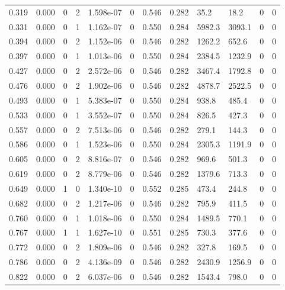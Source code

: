 \documentclass[preview]{standalone}
\begin{document}
{{\begin{tabular}{L{1.2cm}C{1.2cm} C{0.3cm}C{0.5cm} C{1.4cm}C{1.4cm} C{1.4cm}C{1.4cm} C{1.6cm}C{1.6cm} C{1.6cm}C{1.6cm}}
  0.319  &  0.000  & 0     &  2 &  1.598e-07  & 0  &  0.546&   0.282& 35.2 & 18.2   &  0 & 0  \\ 
  0.331  &  0.000  & 0     &  1 &  1.162e-07  & 0  &  0.550&   0.284& 5982.3 & 3093.1   &  0 & 0  \\ 
  0.394  &  0.000  & 0     &  2 &  1.152e-06  & 0  &  0.546&   0.282& 1262.2 & 652.6   &  0 & 0  \\ 
  0.397  &  0.000  & 0     &  1 &  1.013e-06  & 0  &  0.550&   0.284& 2384.5 & 1232.9   &  0 & 0  \\ 
  0.427  &  0.000  & 0     &  2 &  2.572e-06  & 0  &  0.546&   0.282& 3467.4 & 1792.8   &  0 & 0  \\ 
  0.476  &  0.000  & 0     &  2 &  1.902e-06  & 0  &  0.546&   0.282& 4878.7 & 2522.5   &  0 & 0  \\ 
  0.493  &  0.000  & 0     &  1 &  5.383e-07  & 0  &  0.550&   0.284& 938.8 & 485.4   &  0 & 0  \\ 
  0.533  &  0.000  & 0     &  1 &  3.552e-07  & 0  &  0.550&   0.284& 826.5 & 427.3   &  0 & 0  \\ 
  0.557  &  0.000  & 0     &  2 &  7.513e-06  & 0  &  0.546&   0.282& 279.1 & 144.3   &  0 & 0  \\ 
  0.586  &  0.000  & 0     &  1 &  1.523e-06  & 0  &  0.550&   0.284& 2305.3 & 1191.9   &  0 & 0  \\ 
  0.605  &  0.000  & 0     &  2 &  8.816e-07  & 0  &  0.546&   0.282& 969.6 & 501.3   &  0 & 0  \\ 
  0.619  &  0.000  & 0     &  2 &  8.779e-06  & 0  &  0.546&   0.282& 1379.6 & 713.3   &  0 & 0  \\ 
  0.649  &  0.000  & 1     &  0 &  1.340e-10  & 0  &  0.552&   0.285& 473.4 & 244.8   &  0 & 0  \\ 
  0.682  &  0.000  & 0     &  2 &  1.217e-06  & 0  &  0.546&   0.282& 795.9 & 411.5   &  0 & 0  \\ 
  0.760  &  0.000  & 0     &  1 &  1.018e-06  & 0  &  0.550&   0.284& 1489.5 & 770.1   &  0 & 0  \\ 
  0.767  &  0.000  & 1     &  1 &  1.627e-10  & 0  &  0.551&   0.285& 730.3 & 377.6   &  0 & 0  \\ 
  0.772  &  0.000  & 0     &  2 &  1.809e-06  & 0  &  0.546&   0.282& 327.8 & 169.5   &  0 & 0  \\ 
  0.786  &  0.000  & 0     &  2 &  4.136e-09  & 0  &  0.546&   0.282& 2430.9 & 1256.9   &  0 & 0  \\ 
  0.822  &  0.000  & 0     &  2 &  6.037e-06  & 0  &  0.546&   0.282& 1543.4 & 798.0   &  0 & 0  \\ 

\end{tabular}}}
\end{document}
